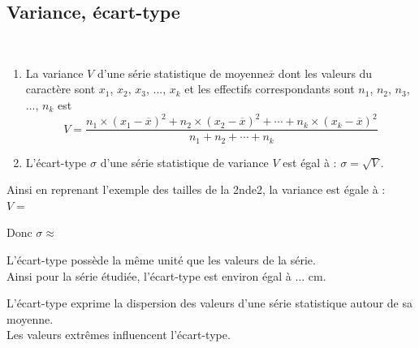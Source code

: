 \subsection{Variance, écart-type}

\begin{Définition} $ $\\

\begin{enumerate}
\item La variance $V$ d'une série statistique de moyenne$\overline{x}$ dont les valeurs du caractère sont $x_1$, $x_2$, $x_3$, ..., $x_k$ et les effectifs correspondants sont $n_1$, $n_2$, $n_3$, ..., $n_k$ est $$V=\dfrac{n_1\times (x_1-\overline{x})^2+n_2\times (x_2-\overline{x})^2+\cdots+n_k\times (x_k-\overline{x})^2}{n_1+n_2+\cdots+n_k}$$

\item L'écart-type $\sigma$ d'une série statistique de variance $V$ est égal à : $\sigma =\sqrt{V}$.
\end{enumerate}
\end{Définition}

\begin{Exemple}
Ainsi en reprenant l'exemple des tailles de la 2nde2, la variance est égale à : \\

$V=$ \ligne

\ligne

Donc $\sigma\approx$ \ligne

L'écart-type possède la même unité que les valeurs de la série. \\
Ainsi pour la série étudiée, l'écart-type est environ égal à $\dots$ cm.
\end{Exemple}

\begin{Remarque}
L'écart-type exprime la dispersion des valeurs d'une série statistique autour de sa moyenne. \\
Les valeurs extrêmes influencent l'écart-type.

\end{Remarque}

\bigskip

\newpage

